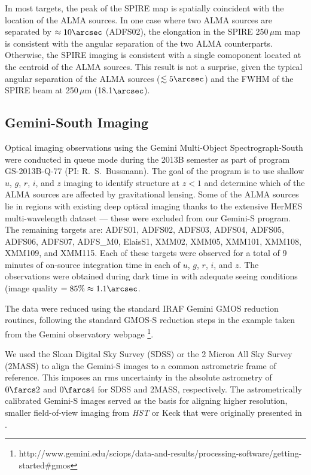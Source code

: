 \documentclass[iop]{emulateapj}
\begin{document}
In most targets, the peak of the SPIRE map is spatially coincident with the
location of the ALMA sources.  In one case where two ALMA sources are separated
by $\approx 10\arcsec$ (ADFS02), the elongation in the SPIRE 250$\,\mu$m map is
consistent with the angular separation of the two ALMA counterparts.
Otherwise, the SPIRE imaging is consistent with a single comoponent located at
the centroid of the ALMA sources.  This result is not a surprise, given the
typical angular separation of the ALMA sources ($\lesssim 5\arcsec$) and the
FWHM of the SPIRE beam at 250$\,\mu$m (18.1$\arcsec$). 

\subsection{Gemini-South Imaging}\label{sec:geminiobs}

Optical imaging observations using the Gemini Multi-Object Spectrograph-South
\citep[GMOS-S;][]{Hook:2004qy} were conducted in queue mode during the 2013B
semester as part of program GS-2013B-Q-77 (PI: R.~S.~Bussmann).  The goal of
the program is to use shallow $u$, $g$, $r$, $i$, and $z$ imaging to identify
structure at $z<1$ and determine which of the ALMA sources are affected by
gravitational lensing.  Some of the ALMA sources lie in regions with existing
deep optical imaging thanks to the extensive HerMES multi-wavelength dataset
--- these were excluded from our Gemini-S program.  The remaining targets are:
ADFS01, ADFS02, ADFS03, ADFS04, ADFS05, ADFS06, ADFS07, ADFS\_M0, ElaisS1,
XMM02, XMM05, XMM101, XMM108, XMM109, and XMM115.  Each of these targets were
observed for a total of 9$\,$minutes of on-source integration time in each of
$u$, $g$, $r$, $i$, and $z$.  The observations were obtained during dark time
in with adequate seeing conditions (image quality $ = 85\% \approx 1.1\arcsec$.

The data were reduced using the standard {\sc IRAF} Gemini GMOS reduction
routines, following the standard GMOS-S reduction steps in the example taken
from the Gemini observatory webpage
\footnote{http://www.gemini.edu/sciops/data-and-results/processing-software/getting-started\#gmos}.

We used the Sloan Digital Sky Survey (SDSS) or the 2 Micron All Sky Survey
(2MASS) to align the Gemini-S images to a common astrometric frame of
reference.  This imposes an rms uncertainty in the absolute astrometry of
$0\farcs2$ and $0\farcs4$ for SDSS and 2MASS, respectively.  The
astrometrically calibrated Gemini-S images served as the basis for aligning
higher resolution, smaller field-of-view imaging from {\it HST} or Keck that
were originally presented in \citet{Calanog:2014lr}.
\end{document}
